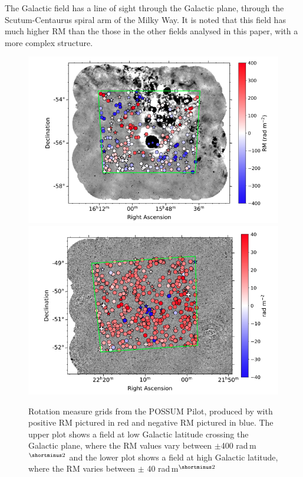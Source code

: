 The Galactic field has a line of sight through the Galactic plane, through the Scutum-Centaurus spiral arm of the Milky Way. It is noted that this field has much higher RM than the those in the other fields analysed in this paper, with a more complex structure.

\begin{figure}
    \centering
    \includegraphics[width=0.9\linewidth]{Thesis_Template/Figures/Shannon_GL.png}
    \includegraphics[width=0.9\linewidth]{Thesis_Template/Figures/Shannon_EC.png}
    \caption{Rotation measure grids from the POSSUM Pilot, produced by \cite{vanderwoude2024prototypefaradayrotationmeasure} with positive RM pictured in red and negative RM pictured in blue. The upper plot shows a field at low Galactic latitude crossing the Galactic plane, where the RM values vary between $\pm$400 rad$\,$m$^{\shortminus2}$ and the lower plot shows a field at high Galactic latitude, where the RM varies between $\pm$ 40 rad$\,$m$^{\shortminus2}$}
    \label{fig: Shannon's RM grids}
\end{figure}

